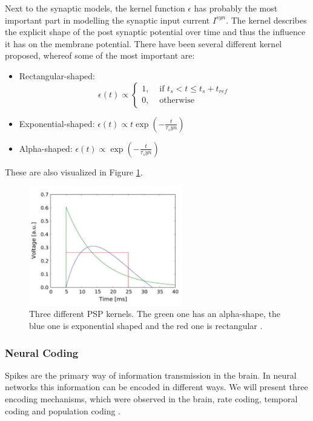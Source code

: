 Next to the synaptic models, the kernel function $\epsilon$ has probably the most important part in modelling the synaptic input current $I^{syn}$. 
The kernel describes the explicit shape of the post synaptic potential over time and thus the influence it has on the membrane potential.
There have been several different kernel proposed, whereof some of the most important are:
\begin{itemize}
\item Rectangular-shaped: \[\epsilon(t) \propto  \begin{cases} 1, & \text{ if } t_{s} < t \le t_{s} + t_{ref} \\ 0, & \text{ otherwise } \end{cases} \]
\item Exponential-shaped: $\epsilon(t) \propto t \exp(- \frac{t}{\tau_syn})$
\item Alpha-shaped: $\epsilon(t) \propto \exp(- \frac{t}{\tau_syn})$
\end{itemize}

These are also visualized in Figure \ref{fig:pspkernels}.

\begin{figure}
	\centering
    	\includegraphics[width=0.6\textwidth]{imgs/psp_kernel.png} 
    \caption[PSP kernels.]{Three different PSP kernels. The green one has an alpha-shape, the blue one is exponential shaped and the red one is rectangular \cite{Petrovici2016}. }
	\label{fig:pspkernels}
\end{figure}

\subsubsection{Neural Coding} \label{c:neuralcoding}

Spikes are the primary way of information transmission in the brain.
In neural networks this information can be encoded in different ways.
We will present three encoding mechanisms, which were observed in the brain, rate coding, temporal coding and population coding \cite{Meftah2013}.

